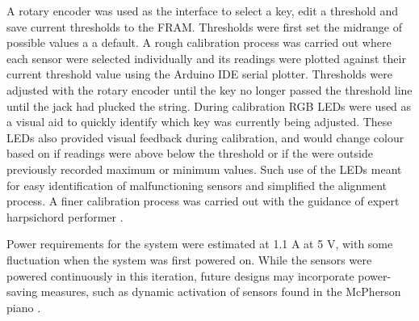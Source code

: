A rotary encoder was used as the interface to select a key, edit a threshold and save current thresholds to the FRAM.
Thresholds were first set the midrange of possible values a a default. A rough calibration process was carried out where each sensor were selected individually and its readings were plotted against their current threshold value using the Arduino IDE serial plotter. Thresholds were adjusted with the rotary encoder until the key no longer passed the threshold line until the jack had plucked the string. During calibration RGB LEDs were used as a visual aid to quickly identify which key was currently being adjusted. These LEDs also provided visual feedback during calibration, and would change colour based on if readings were above below the threshold or if the were outside previously recorded maximum or minimum values. Such use of the LEDs meant for easy identification of malfunctioning sensors and simplified the alignment process. A finer calibration process was carried out with the guidance of expert harpsichord performer .

Power requirements for the system were estimated at 1.1 A at 5 V, with some fluctuation when the system was first powered on. While the sensors were powered continuously in this iteration, future designs may incorporate power-saving measures, such as dynamic activation of sensors found in the McPherson piano \cite{McPherson2013}.


